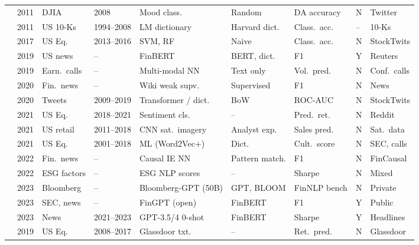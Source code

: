 \begin{longtable}{p{2.4cm} p{0.6cm} p{1.0cm} p{1.0cm} p{2.0cm} p{1.5cm} p{1.3cm} p{0.7cm} p{1.3cm}}
\citet{Bollen2011}     & 2011 & DJIA      & 2008       & Mood class.\        & Random         & DA accuracy   & N & Twitter \\
\citet{Loughran2011}   & 2011 & US 10-Ks  & 1994--2008 & LM dictionary       & Harvard dict.\ & Class.\ acc.\ & -- & 10-Ks  \\
\citet{Oliveira2017}   & 2017 & US Eq.\   & 2013--2016 & SVM, RF             & Naive          & Class.\ acc.\ & N & StockTwits \\
\citet{Araci2019}      & 2019 & US news   & --         & FinBERT             & BERT, dict.\   & F1            & Y & Reuters \\
\citet{Qin2019}        & 2019 & Earn.\ calls & --      & Multi-modal NN      & Text only      & Vol.\ pred.\  & N & Conf.\ calls \\
\citet{EinDor2020}     & 2020 & Fin.\ news & --        & Wiki weak supv.\    & Supervised     & F1            & N & News    \\
\citet{Renault2020}    & 2020 & Tweets    & 2009--2019 & Transformer / dict.\ & BoW           & ROC-AUC       & N & StockTwits \\
\citet{Bradley2021}    & 2021 & US Eq.\   & 2018--2021 & Sentiment cls.\     & --             & Pred.\ ret.\  & N & Reddit  \\
\citet{Katona2021}     & 2021 & US retail & 2011--2018 & CNN sat.\ imagery   & Analyst exp.\  & Sales pred.\  & N & Sat.\ data \\
\citet{Li2021}         & 2021 & US Eq.\   & 2001--2018 & ML (Word2Vec+)      & Dict.\         & Cult.\ score  & N & SEC, calls \\
\citet{Mariko2022}     & 2022 & Fin.\ news & --        & Causal IE NN        & Pattern match. & F1            & N & FinCausal \\
\citet{Kalesnik2022}   & 2022 & ESG factors & --       & ESG NLP scores      & --             & Sharpe        & N & Mixed   \\
\citet{Wu2023}         & 2023 & Bloomberg & --         & Bloomberg-GPT (50B) & GPT, BLOOM     & FinNLP bench  & N & Private \\
\citet{Yang2023}       & 2023 & SEC, news & --         & FinGPT (open)       & FinBERT        & F1            & Y & Public  \\
\citet{LopezLira2023}  & 2023 & News      & 2021--2023 & GPT-3.5/4 0-shot    & FinBERT        & Sharpe        & Y & Headlines \\
\citet{Green2019}      & 2019 & US Eq.\   & 2008--2017 & Glassdoor txt.\     & --             & Ret.\ pred.\  & N & Glassdoor \\

\end{longtable}

